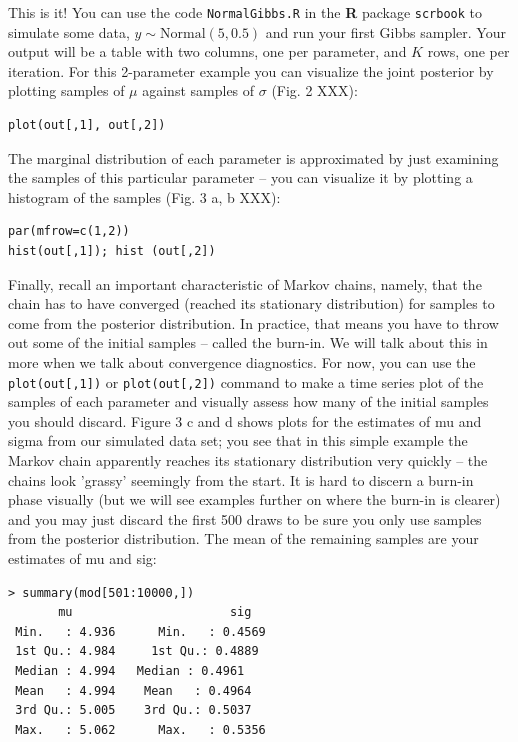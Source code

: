 This is it! You can use the code \mbox{\tt NormalGibbs.R} in the {\bf
  R} package \mbox{\tt scrbook}
to simulate some data, $y \sim \mbox{Normal}(5, 0.5)$ and run your first
Gibbs sampler. Your output will be a table with two columns, one per
parameter, and $K$ rows, one per iteration. For this 2-parameter example
you can visualize the joint posterior by plotting samples of $\mu$
against samples of $\sigma$ (Fig. 2 XXX):
\begin{verbatim}
plot(out[,1], out[,2])
\end{verbatim}
The marginal distribution of each parameter is approximated by just
examining the samples of this particular parameter – you can visualize
it by plotting a histogram of the samples (Fig. 3 a, b XXX):
\begin{verbatim}
par(mfrow=c(1,2))
hist(out[,1]); hist (out[,2])
\end{verbatim}

Finally, recall an important characteristic of Markov chains, namely,
that the chain has to have converged (reached its stationary
distribution) for samples to come from the posterior distribution. In
practice, that means you have to throw out some of the initial samples
– called the burn-in. We will talk about this in more when we talk
about convergence diagnostics. For now, you can use the
\verb#plot(out[,1])# or \verb#plot(out[,2])# command to make a time
series plot of the samples of each parameter and visually assess how
many of the initial samples you should discard. Figure 3 c and d shows
plots for the estimates of mu and sigma from our simulated data set;
you see that in this simple example the Markov chain apparently
reaches its stationary distribution very quickly – the chains look
'grassy' seemingly from the start. It is hard to discern a burn-in
phase visually (but we will see examples further on where the burn-in
is clearer) and you may just discard the first 500 draws to be sure
you only use samples from the posterior distribution. The mean of the
remaining samples are your estimates of mu and sig:
\begin{verbatim}
> summary(mod[501:10000,])
       mu                      sig
 Min.   : 4.936      Min.   : 0.4569
 1st Qu.: 4.984     1st Qu.: 0.4889
 Median : 4.994   Median : 0.4961
 Mean   : 4.994    Mean   : 0.4964
 3rd Qu.: 5.005    3rd Qu.: 0.5037
 Max.   : 5.062      Max.   : 0.5356
\end{verbatim}

